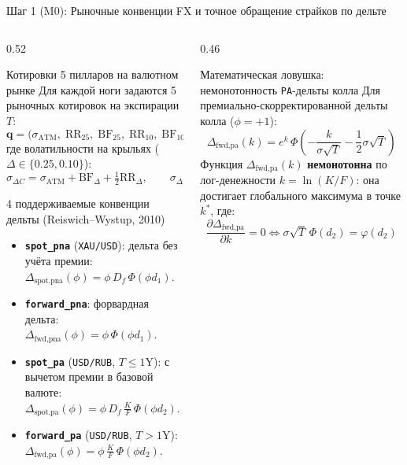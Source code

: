 \documentclass[aspectratio=169, 9pt]{beamer}
\begin{document}
\begin{frame}{Шаг 1 (M0): Рыночные конвенции FX и точное обращение страйков по дельте}
  \begin{columns}[T]
    \begin{column}{0.52\textwidth}
      \begin{block}{Котировки 5 пилларов на валютном рынке}
        Для каждой ноги задаются 5 рыночных котировок на экспирации $T$:
        $$\bm{q} = \big(\sigma_{\text{ATM}},\; \text{RR}_{25},\; \text{BF}_{25},\; \text{RR}_{10},\; \text{BF}_{10}\big)$$
        где волатильности на крыльях ($\Delta \in \{0.25, 0.10\}$):
        $$\sigma_{\Delta C} = \sigma_{\text{ATM}} + \text{BF}_\Delta + \tfrac{1}{2}\text{RR}_\Delta, \qquad
          \sigma_{\Delta P} = \sigma_{\text{ATM}} + \text{BF}_\Delta - \tfrac{1}{2}\text{RR}_\Delta$$
      \end{block}

      \begin{block}{4 поддерживаемые конвенции дельты (Reiswich--Wystup, 2010)}
        \begin{itemize}
          \item \textbf{\texttt{spot\_pna}} (\texttt{XAU/USD}): дельта без учёта премии:
            $\Delta_{\text{spot,pna}}(\phi) = \phi\, D_f\, \Phi(\phi d_1)$.
          \item \textbf{\texttt{forward\_pna}}: форвардная дельта:
            $\Delta_{\text{fwd,pna}}(\phi) = \phi\, \Phi(\phi d_1)$.
          \item \textbf{\texttt{spot\_pa}} (\texttt{USD/RUB}, $T \le 1\text{Y}$): с вычетом премии в базовой валюте:
            $\Delta_{\text{spot,pa}}(\phi) = \phi\, D_f\, \frac{K}{F}\, \Phi(\phi d_2)$.
          \item \textbf{\texttt{forward\_pa}} (\texttt{USD/RUB}, $T > 1\text{Y}$):
            $\Delta_{\text{fwd,pa}}(\phi) = \phi\, \frac{K}{F}\, \Phi(\phi d_2)$.
        \end{itemize}
      \end{block}
    \end{column}

    \begin{column}{0.46\textwidth}
      \begin{alertblock}{Математическая ловушка: немонотонность \texttt{PA}-дельты колла}
        Для премиально-скорректированной дельты колла ($\phi = +1$):
        $$\Delta_{\text{fwd,pa}}(k) = e^{k}\,\Phi\!\left(-\frac{k}{\sigma\sqrt{T}} - \frac{1}{2}\sigma\sqrt{T}\right)$$
        Функция $\Delta_{\text{fwd,pa}}(k)$ \textbf{немонотонна} по лог-денежности $k = \ln(K/F)$: она достигает глобального максимума в точке $k^*$, где:
        $$\frac{\partial \Delta_{\text{fwd,pa}}}{\partial k} = 0 \iff \sigma\sqrt{T}\,\Phi(d_2) = \varphi(d_2)$$
      \end{alertblock}


\end{column}
\end{columns}
\end{frame}
\end{document}
